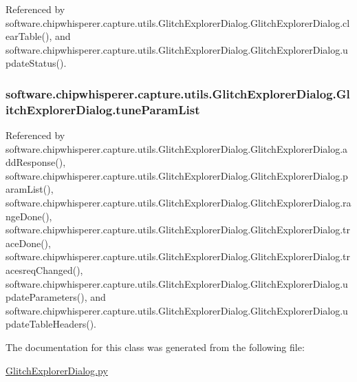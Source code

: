Referenced by software.\+chipwhisperer.\+capture.\+utils.\+Glitch\+Explorer\+Dialog.\+Glitch\+Explorer\+Dialog.\+clear\+Table(), and software.\+chipwhisperer.\+capture.\+utils.\+Glitch\+Explorer\+Dialog.\+Glitch\+Explorer\+Dialog.\+update\+Status().

\hypertarget{classsoftware_1_1chipwhisperer_1_1capture_1_1utils_1_1GlitchExplorerDialog_1_1GlitchExplorerDialog_adc4bbdddb1abd11ae9e8856f079592c3}{}
\subsubsection[{tune\+Param\+List}]{\setlength{\rightskip}{0pt plus 5cm}software.\+chipwhisperer.\+capture.\+utils.\+Glitch\+Explorer\+Dialog.\+Glitch\+Explorer\+Dialog.\+tune\+Param\+List}\label{classsoftware_1_1chipwhisperer_1_1capture_1_1utils_1_1GlitchExplorerDialog_1_1GlitchExplorerDialog_adc4bbdddb1abd11ae9e8856f079592c3}


Referenced by software.\+chipwhisperer.\+capture.\+utils.\+Glitch\+Explorer\+Dialog.\+Glitch\+Explorer\+Dialog.\+add\+Response(), software.\+chipwhisperer.\+capture.\+utils.\+Glitch\+Explorer\+Dialog.\+Glitch\+Explorer\+Dialog.\+param\+List(), software.\+chipwhisperer.\+capture.\+utils.\+Glitch\+Explorer\+Dialog.\+Glitch\+Explorer\+Dialog.\+range\+Done(), software.\+chipwhisperer.\+capture.\+utils.\+Glitch\+Explorer\+Dialog.\+Glitch\+Explorer\+Dialog.\+trace\+Done(), software.\+chipwhisperer.\+capture.\+utils.\+Glitch\+Explorer\+Dialog.\+Glitch\+Explorer\+Dialog.\+tracesreq\+Changed(), software.\+chipwhisperer.\+capture.\+utils.\+Glitch\+Explorer\+Dialog.\+Glitch\+Explorer\+Dialog.\+update\+Parameters(), and software.\+chipwhisperer.\+capture.\+utils.\+Glitch\+Explorer\+Dialog.\+Glitch\+Explorer\+Dialog.\+update\+Table\+Headers().



The documentation for this class was generated from the following file\+:\begin{DoxyCompactItemize}
\item 
\hyperlink{GlitchExplorerDialog_8py}{Glitch\+Explorer\+Dialog.\+py}\end{DoxyCompactItemize}
